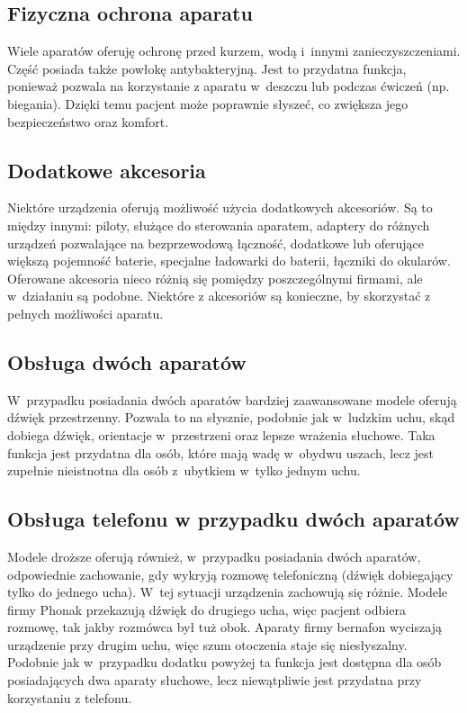 \documentclass[journal]{IEEEtran}
\begin{document}
\subsection{Fizyczna ochrona aparatu}

Wiele aparatów oferuję ochronę przed kurzem, wodą i~innymi zanieczyszczeniami. Część posiada także powłokę antybakteryjną. Jest to przydatna funkcja, ponieważ pozwala na korzystanie z aparatu w~deszczu lub podczas ćwiczeń (np. biegania). Dzięki temu pacjent może poprawnie słyszeć, co zwiększa jego bezpieczeństwo oraz komfort.

\subsection{Dodatkowe akcesoria}

Niektóre urządzenia oferują możliwość użycia dodatkowych akcesoriów. Są to między innymi: piloty, służące do sterowania aparatem, adaptery do różnych urządzeń pozwalające na bezprzewodową łączność, dodatkowe lub oferujące większą pojemność baterie, specjalne ładowarki do baterii, łączniki do okularów. Oferowane akcesoria nieco różnią się pomiędzy poszczególnymi firmami, ale w~działaniu są podobne. Niektóre z akcesoriów są konieczne, by skorzystać z pełnych możliwości aparatu.

\subsection{Obsługa dwóch aparatów}

W~przypadku posiadania dwóch aparatów bardziej zaawansowane modele oferują dźwięk przestrzenny. Pozwala to na słysznie, podobnie jak w~ludzkim uchu, skąd dobiega dźwięk, orientacje w~przestrzeni oraz lepsze wrażenia słuchowe. Taka funkcja jest przydatna dla osób, które mają wadę w~obydwu uszach, lecz jest zupełnie nieistnotna dla osób z~ubytkiem w~tylko jednym uchu.

\subsection{Obsługa telefonu w przypadku dwóch aparatów}

Modele droższe oferują również, w~przypadku posiadania dwóch aparatów, odpowiednie zachowanie, gdy wykryją rozmowę telefoniczną (dźwięk dobiegający tylko do jednego ucha). W~tej sytuacji urządzenia zachowują się różnie. Modele firmy Phonak przekazują dźwięk do drugiego ucha, więc pacjent odbiera rozmowę, tak jakby rozmówca był tuż obok. Aparaty firmy bernafon wyciszają urządzenie przy drugim uchu, więc szum otoczenia staje się niesłyszalny. Podobnie jak w~przypadku dodatku powyżej ta funkcja jest dostępna dla osób posiadających dwa aparaty słuchowe, lecz niewątpliwie jest przydatna przy korzystaniu z telefonu.
\end{document}

